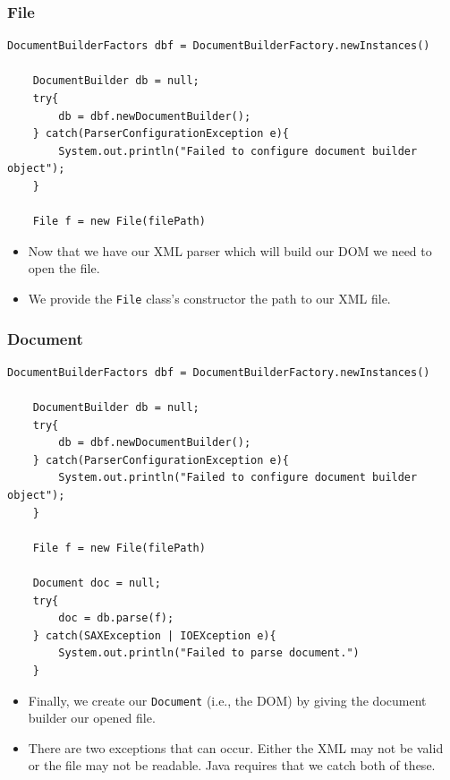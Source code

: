 \documentclass{beamer}
\begin{document}
\begin{frame}[fragile]
    \frametitle{File}
    \begin{lstlisting}[basicstyle=\tiny]
    DocumentBuilderFactors dbf = DocumentBuilderFactory.newInstances()

    DocumentBuilder db = null;
    try{
        db = dbf.newDocumentBuilder();
    } catch(ParserConfigurationException e){
        System.out.println("Failed to configure document builder object");
    }

    File f = new File(filePath)
    \end{lstlisting}
    \begin{itemize}
        \item Now that we have our XML parser which will build our DOM we need to open the file.
        \item We provide the \lstinline|File| class's constructor the path to our XML file.
    \end{itemize}
\end{frame}

\begin{frame}[fragile]
    \frametitle{Document}
    \begin{lstlisting}[basicstyle=\tiny]
    DocumentBuilderFactors dbf = DocumentBuilderFactory.newInstances()

    DocumentBuilder db = null;
    try{
        db = dbf.newDocumentBuilder();
    } catch(ParserConfigurationException e){
        System.out.println("Failed to configure document builder object");
    }

    File f = new File(filePath)

    Document doc = null;
    try{
        doc = db.parse(f);
    } catch(SAXException | IOEXception e){
        System.out.println("Failed to parse document.")
    }
    \end{lstlisting}
    \begin{itemize}
        \item Finally, we create our \lstinline|Document| (i.e., the DOM) by giving the document builder our opened file.
        \item There are two exceptions that can occur. Either the XML may not be valid or the file may not be readable. Java requires that we catch both of these.
    \end{itemize}
\end{frame}
\end{document}
